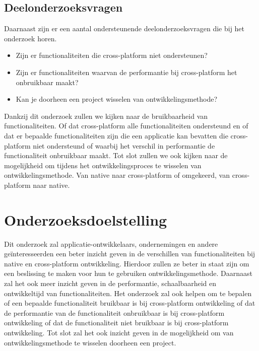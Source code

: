 \subsection{Deelonderzoeksvragen}

Daarnaast zijn er een aantal ondersteunende deelonderzoeksvragen die bij het onderzoek horen.

\begin{itemize}
    \item Zijn er functionaliteiten die cross-platform niet ondersteunen?
    \item Zijn er functionaliteiten waarvan de performantie bij cross-platform het onbruikbaar maakt?
    \item Kan je doorheen een project wisselen van ontwikkelingsmethode?
\end{itemize}

Dankzij dit onderzoek zullen we kijken naar de bruikbaarheid van functionaliteiten. 
Of dat cross-platform alle functionaliteiten ondersteund en of dat er bepaalde functionaliteiten zijn die een applicatie kan bevatten 
die cross-platform niet ondersteund of waarbij het verschil in performantie de functionaliteit onbruikbaar maakt. 
Tot slot zullen we ook kijken naar de mogelijkheid om tijdens het ontwikkelingsproces te wisselen van ontwikkelingsmethode. 
Van native naar cross-platform of omgekeerd, van cross-platform naar native.

\section{Onderzoeksdoelstelling}%
\label{sec:onderzoeksdoelstelling}

Dit onderzoek zal applicatie-ontwikkelaars, ondernemingen en andere geïnteresseerden een beter inzicht geven in de verschillen van functionaliteiten 
bij native en cross-platform ontwikkeling. Hierdoor zullen ze beter in staat zijn om een beslissing te maken voor hun te gebruiken ontwikkelingsmethode. 
Daarnaast zal het ook meer inzicht geven in de performantie, schaalbaarheid en ontwikkeltijd van functionaliteiten. 
Het onderzoek zal ook helpen om te bepalen of een bepaalde functionaliteit bruikbaar is bij cross-platform ontwikkeling of dat de 
performantie van de functionaliteit onbruikbaar is bij cross-platform ontwikkeling of dat de functionaliteit niet bruikbaar is bij cross-platform ontwikkeling. 
Tot slot zal het ook inzicht geven in de mogelijkheid om van ontwikkelingsmethode te wisselen doorheen een project.

